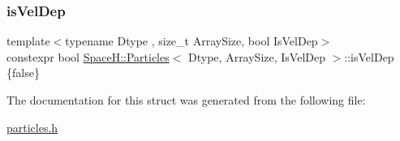 \subsubsection{\texorpdfstring{is\+Vel\+Dep}{isVelDep}}
{\footnotesize\ttfamily template$<$typename Dtype , size\+\_\+t Array\+Size, bool Is\+Vel\+Dep$>$ \\
constexpr bool \mbox{\hyperlink{struct_space_h_1_1_particles}{Space\+H\+::\+Particles}}$<$ Dtype, Array\+Size, Is\+Vel\+Dep $>$\+::is\+Vel\+Dep \{false\}\hspace{0.3cm}{\ttfamily [static]}}



The documentation for this struct was generated from the following file\+:\begin{DoxyCompactItemize}
\item 
\mbox{\hyperlink{particles_8h}{particles.\+h}}\end{DoxyCompactItemize}
